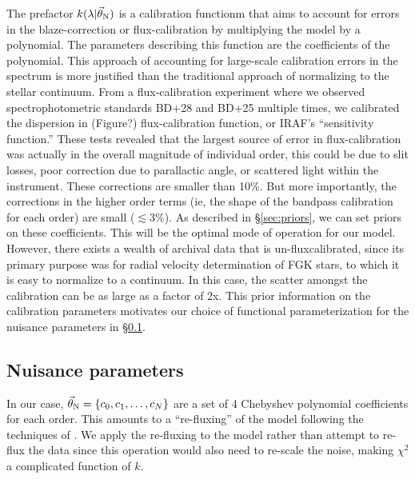 \documentclass[preprint]{aastex} %
\newcommand{\vt}{\vec{\theta}}
\newcommand{\vN}{\vt_{\rm N}}
\begin{document}
The prefactor $k(\lambda | \vN)$ is a calibration functionm that aims to account for errors in the blaze-correction or flux-calibration by multiplying the model by a polynomial. The parameters describing this function are the coefficients of the polynomial. This approach of accounting for large-scale calibration errors in the spectrum is more justified than the traditional approach of normalizing to the stellar continuum. From a flux-calibration experiment where we observed spectrophotometric standards BD+28 and BD+25 multiple times, we calibrated the dispersion in (Figure?) flux-calibration function, or IRAF's ``sensitivity function.'' These tests revealed that the largest source of error in flux-calibration was actually in the overall magnitude of individual order, this could be due to slit losses, poor correction due to parallactic angle, or scattered light within the instrument. These corrections are smaller than 10\%. But more importantly, the corrections in the higher order terms (ie, the shape of the bandpass calibration for each order) are small ($\lesssim 3\%$). As described in \S\ref{sec:priors}, we can set priors on these coefficients. This will be the optimal mode of operation for our model. However, there exists a wealth of archival data that is un-fluxcalibrated, since its primary purpose was for radial velocity determination of FGK stars, to which it is easy to normalize to a continuum. In this case, the scatter amongst the calibration can be as large as a factor of 2x. This prior information on the calibration parameters motivates our choice of functional parameterization for the nuisance parameters in \S\ref{sec:nuisance}. 


\subsection{Nuisance parameters}
\label{sec:nuisance}
In our case, $\vN = \{c_0, c_1, \ldots, c_N\}$ are a set of 4 Chebyshev polynomial coefficients for each order. This amounts to a ``re-fluxing'' of the model following the techniques of \citet{elh+06}. We apply the re-fluxing to the model rather than attempt to re-flux the data since this operation would also need to re-scale the noise, making $\chi^2$ a complicated function of $k$.
\end{document}

